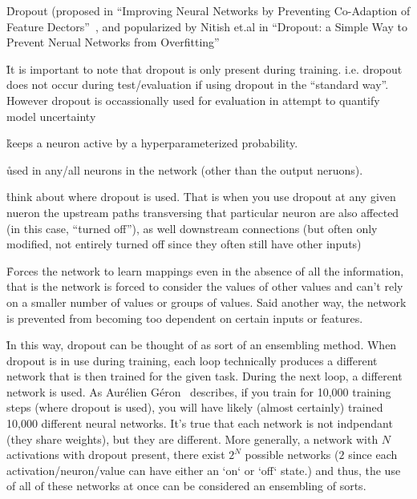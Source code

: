 \r{Dropout (proposed in ``Improving Neural Networks by Preventing Co-Adaption of Feature Dectors''~\cite{DBLP:journals/corr/abs-1207-0580}, and popularized by Nitish et.al in ``Dropout: a Simple Way to Prevent Nerual Networks from Overfitting''~\cite{JMLR:v15:srivastava14a}}

\r{It is important to note that dropout is only present during training. i.e. dropout does not occur during test/evaluation if using dropout in the ``standard way''. However dropout is occassionally used for evaluation in attempt to quantify model uncertainty }

\r{keeps a neuron active by a hyperparameterized probability.}

\r{used in any/all neurons in the network (other than the output neruons).}

\r{think about where dropout is used. That is when you use dropout at any given nueron the upstream paths transversing that particular neuron are also affected (in this case, ``turned off''), as well downstream connections (but often only modified, not entirely turned off since they often still have other inputs) }

\r{Forces the network to learn mappings even in the absence of all the information, that is the network is forced to consider the values of other values and can't rely on a smaller number of values or groups of values. Said another way, the network is prevented from becoming too dependent on certain inputs or features.}

\r{In this way, dropout can be thought of as sort of an ensembling method. When dropout is in use during training, each loop technically produces a different network that is then trained for the given task. During the next loop, a different network is used. As Aurélien Géron~\cite{geron2019hands} describes, if you train for 10,000 training steps (where dropout is used), you will have likely (almost certainly) trained 10,000 different neural networks. It's true that each network is not indpendant (they share weights), but they are different. More generally, a network with $N$ activations with dropout present, there exist $2^N$ possible networks ($2$ since each activation/neuron/value can have either an `on` or `off` state.) and thus, the use of all of these networks at once can be considered an ensembling of sorts.}




